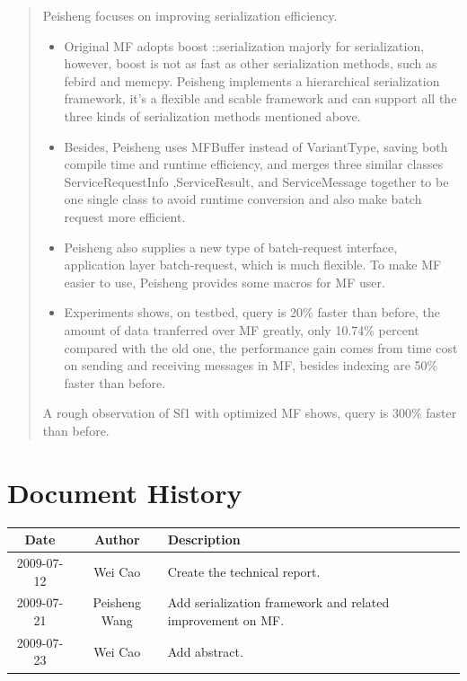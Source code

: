 \documentclass[a4paper,10pt]{article}
\begin{document}
\begin{abstract}
Peisheng focuses on improving serialization efficiency.
\begin{itemize}
\item Original MF adopts boost ::serialization majorly for serialization, however, boost is not as fast as other serialization methods, such as febird and memcpy.
Peisheng implements a hierarchical serialization framework, it's a flexible and scable framework and can support all the three kinds of serialization methods mentioned above.
\item Besides, Peisheng uses MFBuffer instead of VariantType, saving both compile time and runtime efficiency,
and merges three similar classes ServiceRequestInfo ,ServiceResult, and ServiceMessage together to be one single class to avoid 
runtime conversion and also make batch request more efficient.
\item Peisheng also supplies a new type of batch-request interface, application layer batch-request, which is much flexible. To make MF easier to use, Peisheng provides some macros for MF user.
\item Experiments shows, on testbed, query is 20\% faster than before, the amount of data tranferred over MF greatly, only 10.74\% percent compared with the old one, 
the performance gain comes from time cost on sending and receiving messages in MF, besides indexing are 50\% faster than before.
\end{itemize}

A rough observation of Sf1 with optimized MF shows, query is 300\% faster than before.
\end{abstract}

\tableofcontents

\section{Document History}
\begin{center}
\begin{tabular}{|c|c|p{7cm}|}
    \hline
    Date & Author & Description \\ \hline
    2009-07-12& Wei Cao & Create the technical report. \\ \hline
    2009-07-21& Peisheng Wang & Add serialization framework and related improvement on MF. \\ \hline
    2009-07-23& Wei Cao & Add abstract. \\ \hline
\end{tabular}
\end{center}
\end{document}
